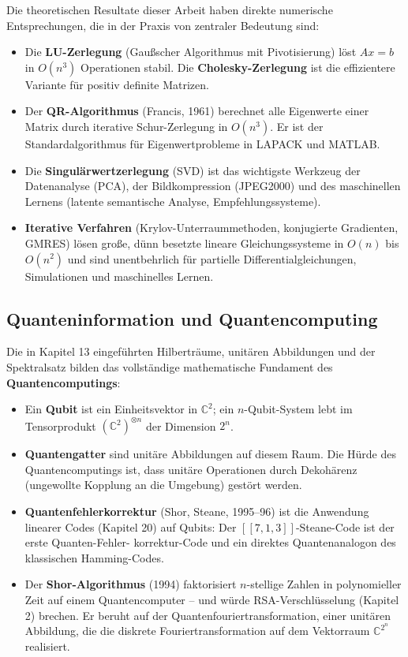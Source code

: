 ﻿\documentclass[a4paper,12pt]{report}
\theoremstyle{definition}
\begin{document}
Die theoretischen Resultate dieser Arbeit haben direkte numerische
Entsprechungen, die in der Praxis von zentraler Bedeutung sind:
\begin{itemize}
    \item[-] Die \textbf{LU-Zerlegung} (Gaußscher Algorithmus mit
          Pivotisierung) löst $Ax = b$ in $O(n^3)$ Operationen
          stabil. Die \textbf{Cholesky-Zerlegung} ist die
          effizientere Variante für positiv definite Matrizen.
    \item[-] Der \textbf{QR-Algorithmus} (Francis, 1961) berechnet
          alle Eigenwerte einer Matrix durch iterative Schur-Zerlegung
          in $O(n^3)$. Er ist der Standardalgorithmus für
          Eigenwertprobleme in LAPACK und MATLAB.
    \item[-] Die \textbf{Singulärwertzerlegung} (SVD) ist das
          wichtigste Werkzeug der Datenanalyse (PCA), der
          Bildkompression (JPEG2000) und des maschinellen Lernens
          (latente semantische Analyse, Empfehlungssysteme).
    \item[-] \textbf{Iterative Verfahren} (Krylov-Unterraummethoden,
          konjugierte Gradienten, GMRES) lösen große, dünn besetzte
          lineare Gleichungssysteme in $O(n)$ bis $O(n^2)$ und sind
          unentbehrlich für partielle Differentialgleichungen,
          Simulationen und maschinelles Lernen.
\end{itemize}

\subsection*{Quanteninformation und Quantencomputing}

Die in Kapitel 13 eingeführten Hilberträume, unitären Abbildungen
und der Spektralsatz bilden das vollständige mathematische Fundament
des \textbf{Quantencomputings}:
\begin{itemize}
    \item[-] Ein \textbf{Qubit} ist ein Einheitsvektor in $\mathbb{C}^2$;
          ein $n$-Qubit-System lebt im Tensorprodukt
          $(\mathbb{C}^2)^{\otimes n}$ der Dimension $2^n$.
    \item[-] \textbf{Quantengatter} sind unitäre Abbildungen auf
          diesem Raum. Die Hürde des Quantencomputings ist, dass
          unitäre Operationen durch Dekohärenz (ungewollte Kopplung
          an die Umgebung) gestört werden.
    \item[-] \textbf{Quantenfehlerkorrektur} (Shor, Steane, 1995--96)
          ist die Anwendung linearer Codes (Kapitel 20) auf Qubits:
          Der $[[7,1,3]]$-Steane-Code ist der erste Quanten-Fehler-
          korrektur-Code und ein direktes Quantenanalogon des
          klassischen Hamming-Codes.
    \item[-] Der \textbf{Shor-Algorithmus} (1994) faktorisiert
          $n$-stellige Zahlen in polynomieller Zeit auf einem
          Quantencomputer -- und würde RSA-Verschlüsselung
          (Kapitel 2) brechen. Er beruht auf der
          Quantenfouriertransformation, einer unitären Abbildung,
          die die diskrete Fouriertransformation auf dem
          Vektorraum $\mathbb{C}^{2^n}$ realisiert.
\end{itemize}
\end{document}
